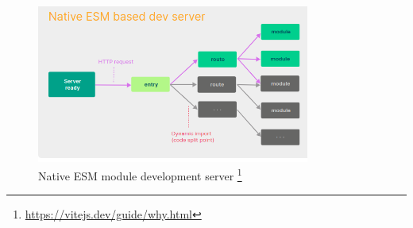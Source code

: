 \documentclass[
]{beamer}
\begin{document}
\begin{frame}
  \begin{figure}
    \includegraphics[width=0.8\textwidth,height=\textheight,keepaspectratio]{images/native_esm_dev_server.png}
    \caption{Native ESM module development server
    \footnote{\url{https://vitejs.dev/guide/why.html}}
  }
  \end{figure}
\end{frame}

\makeoutro
\addtocounter{framenumber}{-1}
\end{document}
